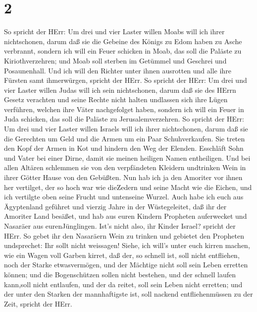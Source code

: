 \hypertarget{section-1}{%
\section{2}\label{section-1}}

 So spricht der HErr: Um drei und vier Laster willen Moabs
will ich ihrer nichtschonen, darum daß sie die Gebeine des Königs zu
Edom haben zu Asche verbrannt,  sondern ich will ein Feuer
schicken in Moab, das soll die Paläste zu Kiriothverzehren; und Moab
soll sterben im Getümmel und Geschrei und Posaunenhall.  Und
ich will den Richter unter ihnen ausrotten und alle ihre Fürsten samt
ihmerwürgen, spricht der HErr.  So spricht der HErr: Um drei
und vier Laster willen Judas will ich sein nichtschonen, darum daß sie
des HErrn Gesetz verachten und seine Rechte nicht halten undlassen sich
ihre Lügen verführen, welchen ihre Väter nachgefolget haben,
 sondern ich will ein Feuer in Juda schicken, das soll die
Paläste zu Jerusalemverzehren.  So spricht der HErr: Um drei
und vier Laster willen Israels will ich ihrer nichtschonen, darum daß
sie die Gerechten um Geld und die Armen um ein Paar Schuhverkaufen.
 Sie treten den Kopf der Armen in Kot und hindern den Weg
der Elenden. Esschläft Sohn und Vater bei einer Dirne, damit sie meinen
heiligen Namen entheiligen.  Und bei allen Altären schlemmen
sie von den verpfändeten Kleidern undtrinken Wein in ihrer Götter Hause
von den Gebüßten.  Nun hab ich ja den Amoriter vor ihnen her
vertilget, der so hoch war wie dieZedern und seine Macht wie die Eichen,
und ich vertilgte oben seine Frucht und untenseine Wurzel. 
Auch habe ich euch aus Ägyptenland geführet und vierzig Jahre in der
Wüstegeleitet, daß ihr der Amoriter Land besäßet,  und hab
aus euren Kindern Propheten auferwecket und Nasaräer aus
eurenJünglingen. Ist's nicht also, ihr Kinder Israel? spricht der HErr.
 So gebet ihr den Nasaräern Wein zu trinken und gebietet
den Propheten undsprechet: Ihr sollt nicht weissagen! 
Siehe, ich will's unter euch kirren machen, wie ein Wagen voll Garben
kirret,  daß der, so schnell ist, soll nicht entfliehen,
noch der Starke etwasvermögen, und der Mächtige nicht soll sein Leben
erretten können;  und die Bogenschützen sollen nicht
bestehen, und der schnell laufen kann,soll nicht entlaufen, und der da
reitet, soll sein Leben nicht erretten;  und der unter den
Starken der mannhaftigste ist, soll nackend entfliehenmüssen zu der
Zeit, spricht der HErr.

